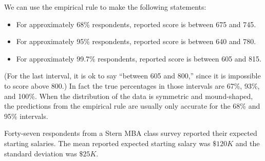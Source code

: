 \documentclass[11pt]{exam}
\begin{document}
\begin{questions}
\begin{solution}
We can use the empirical rule to make the following statements:
\begin{itemize}
  \item For approximately 68\% respondents, reported score is between 675 and
    745.
  \item For approximately 95\% respondents, reported score is between 640 and
    780.
  \item For approximately 99.7\% respondents, reported score is between 605 and
    815.
\end{itemize}
(For the last interval, it is ok to say ``between 605 and 800,'' since it is
impossible to score above 800.)
In fact the true percentages in those intervals are 67\%, 93\%, and 100\%.
When the distribution of the data is symmetric and mound-shaped, the
predictions from the empirical rule are usually only accurate for the 68\% and
95\% intervals.
\end{solution}


%



\question Forty-seven respondents from a Stern MBA class survey reported their
expected starting salaries. The mean reported expected starting salary was
$\$120K$ and the standard deviation was $\$25K$.

\end{questions}
\end{document}
